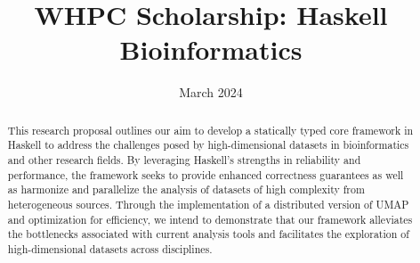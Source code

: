 \documentclass[11pt,letterpaper]{article}
\title{WHPC Scholarship: Haskell Bioinformatics}
\author{}
\date{March 2024}
\begin{document}
\linenumbers
\maketitle

\begin{abstract}

This research proposal outlines our aim to develop a statically typed core framework in Haskell to address the challenges posed by high-dimensional datasets in bioinformatics and other research fields. By leveraging Haskell's strengths in reliability and performance, the framework seeks to provide enhanced correctness guarantees as well as harmonize and parallelize the analysis of datasets of high complexity from heterogeneous sources. Through the implementation of a distributed version of UMAP and optimization for efficiency, we intend to demonstrate that our framework alleviates the bottlenecks associated with current analysis tools and facilitates the exploration of high-dimensional datasets across disciplines.

\end{abstract}
\end{document}

